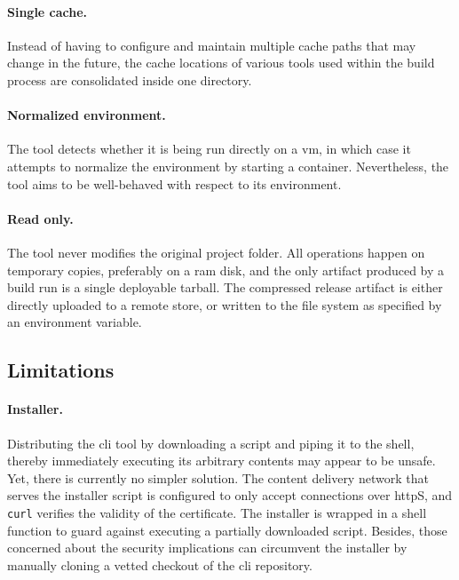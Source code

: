 \paragraph{Single cache.}  Instead of having to configure and maintain multiple cache paths that may change in the future, the cache locations of various tools used within the build process are consolidated inside one directory.

\paragraph{Normalized environment.} The tool detects whether it is being run directly on a \acrshort{vm}, in which case it attempts to normalize the environment by starting a container. Nevertheless, the tool aims to be well-behaved with respect to its environment.

\paragraph{Read only.} The tool never modifies the original project folder. All operations happen on temporary copies, preferably on a \acrshort{ram} disk, and the only artifact produced by a build run is a single deployable tarball. The compressed release artifact is either directly uploaded to a remote store, or written to the file system as specified by an environment variable.

\cleardoublepage
\subsection{Limitations}

\paragraph{Installer.}\label{sec:curlpipesh} Distributing the \acrshort{cli} tool by downloading a script and piping it to the shell, thereby immediately executing its arbitrary contents may appear to be unsafe. Yet, there is currently no simpler solution. The content delivery network that serves the installer script is configured to only accept connections over \acrshort{http}S, and \lstinline|curl| verifies the validity of the certificate. The installer is wrapped in a shell function to guard against executing a partially downloaded script. Besides, those concerned about the security implications can circumvent the installer by manually cloning a vetted checkout of the \acrshort{cli} repository.

